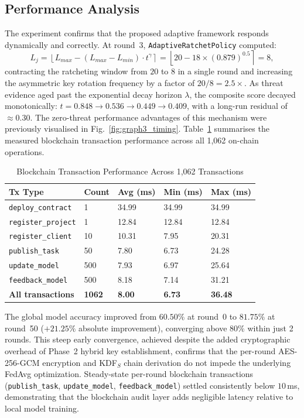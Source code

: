 \documentclass[journal, 10pt, twocolumn]{IEEEtran}
\begin{document}
\subsection{Performance Analysis}
The experiment confirms that the proposed adaptive framework responds dynamically and correctly. At round~3, \texttt{AdaptiveRatchetPolicy} computed:
\begin{equation}
L_j = \left\lfloor L_{max} - (L_{max} - L_{min}) \cdot t^{\gamma} \right\rceil
= \left\lfloor 20 - 18 \times (0.879)^{0.5} \right\rceil = 8,
\end{equation}
contracting the ratcheting window from $20$ to $8$ in a single round and increasing the asymmetric key rotation frequency by a factor of $20/8 = 2.5\times$. As threat evidence aged past the exponential decay horizon $\lambda$, the composite score decayed monotonically: $t = 0.848 \to 0.536 \to 0.449 \to 0.409$, with a long-run residual of $\approx 0.30$. The zero-threat performance advantages of this mechanism were previously visualised in Fig.~\ref{fig:graph3_timing}. Table~\ref{tab:blockchain_perf} summarises the measured blockchain transaction performance across all 1,062 on-chain operations.
\begin{table}
\centering
\caption{Blockchain Transaction Performance Across 1,062 Transactions}
\label{tab:blockchain_perf}
\begin{tabular}{l l l l l}
\toprule
\textbf{Tx Type} & \textbf{Count} & \textbf{Avg (ms)} & \textbf{Min (ms)} & \textbf{Max (ms)} \\
\midrule
\texttt{deploy\_contract}  & 1    & 34.99 & 34.99 & 34.99 \\
\texttt{register\_project} & 1    & 12.84 & 12.84 & 12.84 \\
\texttt{register\_client}  & 10   & 10.31 & 7.95  & 20.31 \\
\texttt{publish\_task}     & 50   & 7.80  & 6.73  & 24.28 \\
\texttt{update\_model}     & 500  & 7.93  & 6.97  & 25.64 \\
\texttt{feedback\_model}   & 500  & 8.18  & 7.14  & 31.21 \\
\midrule
\textbf{All transactions}  & \textbf{1062} & \textbf{8.00} & \textbf{6.73} & \textbf{36.48} \\
\bottomrule
\end{tabular}
\end{table}

The global model accuracy improved from $60.50\%$ at round~0 to $\mathbf{81.75\%}$ at round~50 ($+21.25\%$ absolute improvement), converging above $80\%$ within just 2 rounds. This steep early convergence, achieved despite the added cryptographic overhead of Phase~2 hybrid key establishment, confirms that the per-round AES-256-GCM encryption and KDF$_S$ chain derivation do not impede the underlying FedAvg optimization. Steady-state per-round blockchain transactions (\texttt{publish\_task}, \texttt{update\_model}, \texttt{feedback\_model}) settled consistently below $10$\,ms, demonstrating that the blockchain audit layer adds negligible latency relative to local model training.
\end{document}
